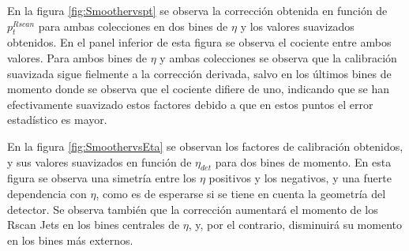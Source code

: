 En la figura \ref{fig:Smoothervspt} se observa la corrección obtenida en función de $p_t^{Rscan}$ para ambas colecciones en dos bines de $\eta$ y los valores suavizados obtenidos. En el panel inferior de esta figura se observa el cociente entre ambos valores. Para ambos bines de $\eta$ y ambas colecciones se observa que la calibración suavizada sigue fielmente a la corrección derivada, salvo en los últimos bines de momento donde se observa que el cociente difiere de uno, indicando que se han efectivamente suavizado estos factores debido a que en estos puntos el error estadístico es mayor.   

En la figura \ref{fig:SmoothervsEta} se observan los factores de calibración obtenidos, y sus valores suavizados en función de $\eta_{det}$ para dos bines de momento. En esta figura se observa una simetría entre los $\eta$ positivos y los negativos, y una fuerte dependencia con $\eta$, como es de esperarse si se tiene en cuenta la geometría del detector. Se observa también que la corrección aumentará el momento de los Rscan Jets en los bines centrales de $\eta$, y, por el contrario, disminuirá su momento en los bines más externos. 
 
